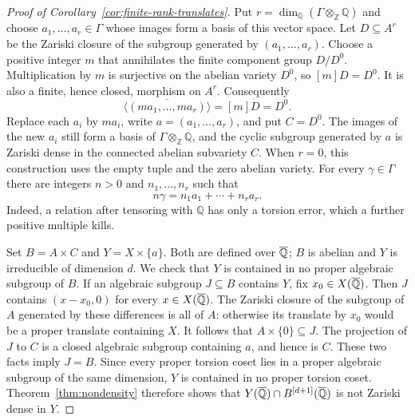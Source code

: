 \begin{proof}[Proof of Corollary~\ref{cor:finite-rank-translates}]
Put $r=\dim_{\mathbb Q}(\Gamma\otimes_{\mathbb Z}\mathbb Q)$ and choose
$a_1,\ldots,a_r\in\Gamma$ whose images form a basis of this vector
space. Let $D\subseteq A^r$ be the Zariski closure of the subgroup
generated by $(a_1,\ldots,a_r)$. Choose a positive integer $m$ that
annihilates the finite component group $D/D^0$. Multiplication by $m$
is surjective on the abelian variety $D^0$, so $[m]D=D^0$. It is also
a finite, hence closed, morphism on $A^r$. Consequently
\[
 \overline{\langle (ma_1,\ldots,ma_r)\rangle}=[m]D=D^0.
\]
Replace each $a_i$ by $ma_i$, write $a=(a_1,\ldots,a_r)$, and put
$C=D^0$. The images of the new $a_i$ still form a basis of
$\Gamma\otimes_{\mathbb Z}\mathbb Q$, and the cyclic subgroup generated
by $a$ is Zariski dense in the connected abelian subvariety $C$.
When $r=0$, this construction uses the empty tuple and the zero abelian
variety. For every $\gamma\in\Gamma$ there are integers $n>0$ and
$n_1,\ldots,n_r$ such that
\begin{equation}\label{eq:finite-rank-relation}
 n\gamma=n_1a_1+\cdots+n_ra_r.
\end{equation}
Indeed, a relation after tensoring with $\mathbb Q$ has only a torsion
error, which a further positive multiple kills.

Set $B=A\times C$ and $Y=X\times\{a\}$. Both are defined over $\overline{\mathbb Q}$;
$B$ is abelian and $Y$ is irreducible of dimension $d$. We check that
$Y$ is contained in no proper algebraic subgroup of $B$. If an
algebraic subgroup $J\subseteq B$ contains $Y$, fix $x_0\in X(\overline{\mathbb Q})$.
Then $J$ contains $(x-x_0,0)$ for every $x\in X(\overline{\mathbb Q})$. The Zariski
closure of the subgroup of $A$ generated by these differences is all of
$A$: otherwise its translate by $x_0$ would be a proper translate
containing $X$.
It follows that $A\times\{0\}\subseteq J$. The projection of $J$ to
$C$ is a closed algebraic subgroup containing $a$, and hence is $C$.
These two facts imply $J=B$. Since every proper torsion coset lies in a
proper algebraic subgroup of the same dimension, $Y$ is contained in
no proper torsion coset. Theorem~\ref{thm:nondensity} therefore shows
that $Y(\overline{\mathbb Q})\cap B^{[d+1]}(\overline{\mathbb Q})$ is not Zariski dense in $Y$.


\end{proof}
